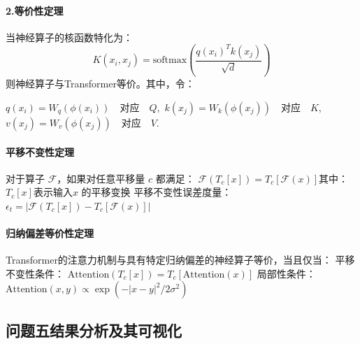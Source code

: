 \documentclass{MMCStyle}
\begin{document}
                \paragraph{2.等价性定理}
当神经算子的核函数特化为：
\[
K(x_i, x_j) = \text{softmax}\left(\frac{q(x_i)^T k(x_j)}{\sqrt{d}}\right)
\]则神经算子与Transformer等价。其中，令：

$q(x_i) = W_q(\phi(x_i)) \quad \text{对应} \quad Q,$
$k(x_j) = W_k(\phi(x_j)) \quad \text{对应} \quad K,$
$v(x_j) = W_v(\phi(x_j)) \quad \text{对应} \quad V.$

\paragraph{平移不变性定理}
对于算子 $\mathcal{F}$，如果对任意平移量 $c$ 都满足： $\mathcal{F}(T_c[x]) = T_c[\mathcal{F}(x)]$其中：$T_c[x]$表示输入$x$ 的平移变换
平移不变性误差度量：$\epsilon_t = |\mathcal{F}(T_c[x]) - T_c[\mathcal{F}(x)]|$

\paragraph*{归纳偏差等价性定理}
 Transformer的注意力机制与具有特定归纳偏差的神经算子等价，当且仅当：
平移不变性条件： $\text{Attention}(T_c[x]) = T_c[\text{Attention}(x)]$
局部性条件： $\text{Attention}(x,y) \propto \exp(-|x-y|^2/2\sigma^2)$

\subsection{问题五结果分析及其可视化}
\end{document}
